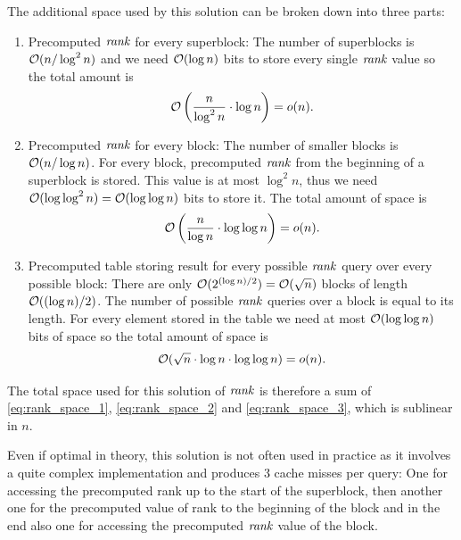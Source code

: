 The additional space used by this solution can be broken down into three parts:
\begin{enumerate}
    \item Precomputed $\mathit{rank}$ for every superblock: The number of superblocks is $\mathcal{O}(n/\log^2 n)$
    and we need $\mathcal{O}(\log n)$ bits to store every single $\mathit{rank}$ value so the total amount is
    \begin{equation}
        \mathcal{O}\left(\frac{n}{\log^2 n}\cdot \log n\right) = o(n).
        \label{eq:rank_space_1}
    \end{equation}
    \item Precomputed $\mathit{rank}$ for every block: The number of smaller blocks is $\mathcal{O}(n/\log n)$. For every
    block, precomputed $\mathit{rank}$ from the beginning of a superblock is stored. This value is at most $\log^2 n$,
    thus we need $\mathcal{O}(\log\log^2 n)=\mathcal{O}(\log\log n)$ bits to store it. The total amount of space is
    \begin{equation}
        \mathcal{O}\left(\frac{n}{\log n}\cdot \log\log n\right)=o(n).
        \label{eq:rank_space_2}
    \end{equation}
    \item Precomputed table storing result for every possible $\mathit{rank}$ query over every possible block: There
    are only $\mathcal{O}(2^{(\log n)/2}) = \mathcal{O}(\sqrt{n})$ blocks of length $\mathcal{O}((\log n)/2)$. The number of
    possible $\mathit{rank}$ queries over a block is equal to its length. For every element stored in the table we need
    at most $\mathcal{O}(\log\log n)$ bits of space so the total amount of space is
    \begin{equation}
        \mathcal{O}(\sqrt{n}\cdot \log n\cdot \log\log n)=o(n).
        \label{eq:rank_space_3}
    \end{equation}
\end{enumerate}

The total space used for this solution of $\mathit{rank}$ is therefore a sum of \ref{eq:rank_space_1}, \ref{eq:rank_space_2}
and \ref{eq:rank_space_3}, which is sublinear in $n$.

Even if optimal in theory, this solution is not often used in practice as it involves a
quite complex implementation and produces 3 cache misses per query:  One for accessing the
precomputed rank up to the start of the superblock, then another one for the precomputed
value of rank to the beginning of the block and in the end also one for accessing the precomputed
$\mathit{rank}$ value of the block.


